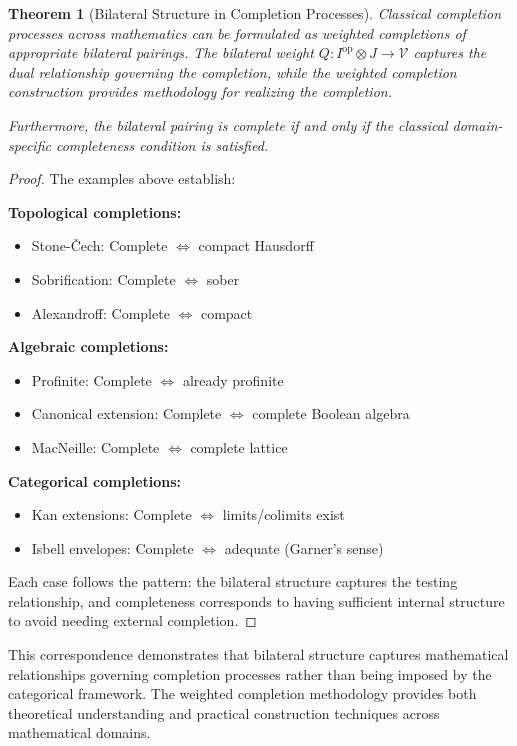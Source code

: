 \documentclass[11pt]{article}
\theoremstyle{plain}
\newtheorem{theorem}{Theorem}[section]
\theoremstyle{definition}
\theoremstyle{remark}
\newcommand{\V}{\mathcal{V}}
\newcommand{\op}{\mathrm{op}}
\begin{document}
\begin{theorem}[Bilateral Structure in Completion Processes]\label{thm:bilateral-examples-summary}
Classical completion processes across mathematics can be formulated as weighted completions of appropriate bilateral pairings. The bilateral weight $Q : I^{\op} \otimes J \to \V$ captures the dual relationship governing the completion, while the weighted completion construction provides methodology for realizing the completion.

Furthermore, the bilateral pairing is complete if and only if the classical domain-specific completeness condition is satisfied.
\end{theorem}

\begin{proof}
The examples above establish:

\textbf{Topological completions:}
\begin{itemize}
\item Stone-\v{C}ech: Complete $\Leftrightarrow$ compact Hausdorff
\item Sobrification: Complete $\Leftrightarrow$ sober
\item Alexandroff: Complete $\Leftrightarrow$ compact
\end{itemize}

\textbf{Algebraic completions:}
\begin{itemize}
\item Profinite: Complete $\Leftrightarrow$ already profinite  
\item Canonical extension: Complete $\Leftrightarrow$ complete Boolean algebra
\item MacNeille: Complete $\Leftrightarrow$ complete lattice
\end{itemize}

\textbf{Categorical completions:}
\begin{itemize}
\item Kan extensions: Complete $\Leftrightarrow$ limits/colimits exist
\item Isbell envelopes: Complete $\Leftrightarrow$ adequate (Garner's sense)
\end{itemize}

Each case follows the pattern: the bilateral structure captures the testing relationship, and completeness corresponds to having sufficient internal structure to avoid needing external completion.
\end{proof}

This correspondence demonstrates that bilateral structure captures mathematical relationships governing completion processes rather than being imposed by the categorical framework. The weighted completion methodology provides both theoretical understanding and practical construction techniques across mathematical domains.
\end{document}
